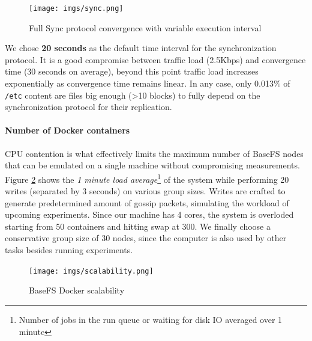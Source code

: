 \documentclass{sig-alternate}
\begin{document}
\begin{figure}
\centering
\texttt{[image: imgs/sync.png]}
\caption{Full Sync protocol convergence with variable execution interval}
\label{fig:sync}
\end{figure}

We chose \textbf{20 seconds} as the default time interval for the synchronization protocol. It is a good compromise between traffic load (2.5Kbps) and convergence time (30 seconds on average), beyond this point traffic load increases exponentially as convergence time remains linear. In any case, only 0.013\% of \texttt{/etc} content are files big enough (>10 blocks) to fully depend on the synchronization protocol for their replication.


\paragraph{Number of Docker containers}

CPU contention is what effectively limits the maximum number of BaseFS nodes that can be emulated on a single machine without compromising measurements. Figure \ref{fig:scalability} shows the \textit{1 minute load average}\footnote{Number of jobs in the run queue or waiting for disk IO averaged over 1 minute} of the system while performing 20 writes (separated by 3 seconds) on various group sizes. Writes are crafted to generate predetermined amount of gossip packets, simulating the workload of upcoming experiments. Since our machine has 4 cores, the system is overloded starting from 50 containers and hitting swap at 300. We finally choose a conservative group size of 30 nodes, since the computer is also used by other tasks besides running experiments.


\begin{figure}
\centering
\texttt{[image: imgs/scalability.png]}
\caption{BaseFS Docker scalability}
\label{fig:scalability}
\end{figure}


\end{document}
